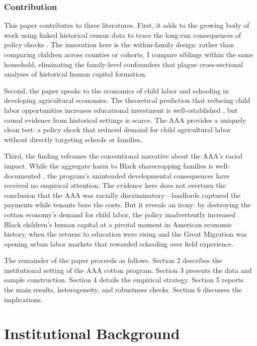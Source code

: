 \documentclass[12pt]{article}
\begin{document}
\subsubsection*{Contribution} This paper contributes to three literatures. First, it adds to the growing body of work using linked historical census data to trace the long-run consequences of policy shocks \citep{abramitzky2021automated, aaronson2021effects, boustan2010effect}. The innovation here is the within-family design: rather than comparing children across counties or cohorts, I compare siblings within the same household, eliminating the family-level confounders that plague cross-sectional analyses of historical human capital formation.

Second, the paper speaks to the economics of child labor and schooling in developing agricultural economies. The theoretical prediction that reducing child labor opportunities increases educational investment is well-established \citep{basu1998child, edmonds2005child}, but causal evidence from historical settings is scarce. The AAA provides a uniquely clean test: a policy shock that reduced demand for child agricultural labor without directly targeting schools or families.

Third, the finding reframes the conventional narrative about the AAA's racial impact. While the aggregate harm to Black sharecropping families is well-documented \citep{alston1993paternalism, woodruff1936farm, grubbs1971cry}, the program's unintended developmental consequences have received no empirical attention. The evidence here does not overturn the conclusion that the AAA was racially discriminatory---landlords captured the payments while tenants bore the costs. But it reveals an irony: by destroying the cotton economy's demand for child labor, the policy inadvertently increased Black children's human capital at a pivotal moment in American economic history, when the returns to education were rising and the Great Migration was opening urban labor markets that rewarded schooling over field experience.

The remainder of the paper proceeds as follows. Section 2 describes the institutional setting of the AAA cotton program. Section 3 presents the data and sample construction. Section 4 details the empirical strategy. Section 5 reports the main results, heterogeneity, and robustness checks. Section 6 discusses the implications.


\section{Institutional Background}
\end{document}
